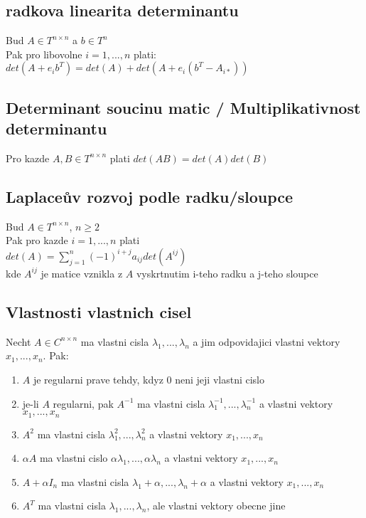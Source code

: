 \documentclass[a4paper]{article}
\begin{document}
\subsection*{radkova linearita determinantu}
Bud $A \in T^{n \times n}$ a $b \in T^n$\\
Pak pro libovolne $i = 1, ..., n$ plati:\\
$det(A + e_ib^T) = det(A) + det(A + e_i(b^T - A_{i*}))$


\subsection*{Determinant soucinu matic / Multiplikativnost determinantu}
Pro kazde $A, B \in T^{n\times n}$ plati $det(AB) = det(A) det(B)$


\subsection*{Laplaceův rozvoj podle radku/sloupce}
Bud $A \in T^{n\times n}$, $n \geq 2$\\
Pak pro kazde $i = 1, ... , n$ plati\\
$det(A) = \sum^n_{j=1}(-1)^{i+j} a_{ij} det(A^{ij})$\\
kde $A^{ij}$ je matice vznikla z $A$ vyskrtnutim i-teho radku a j-teho sloupce


\subsection*{Vlastnosti vlastnich cisel}
Necht $A \in C^{n\times n}$ ma vlastni cisla $\lambda_1, ... , \lambda_n$
a jim odpovidajici vlastni vektory $x_1, ... , x_n$. Pak:
\begin{enumerate}
	\item $A$ je regularni prave tehdy, kdyz 0 neni jeji vlastni cislo
	\item je-li $A$ regularni, pak $A^{-1}$ ma vlastni cisla $\lambda_1^{-1},...,\lambda_n^{-1}$ a vlastni vektory $x_1,...,x_n$
	\item $A^2$ ma vlastni cisla $\lambda_1^2,...,\lambda_n^2$ a vlastni vektory $x_1,...,x_n$
	\item $\alpha A$ ma vlastni cislo $\alpha\lambda_1,...,\alpha\lambda_n$ a vlastni vektory $x_1,...,x_n$
	\item $A+\alpha I_n$ ma vlastni cisla $\lambda_1+\alpha,...,\lambda_n+\alpha$ a vlastni vektory $x_1,...,x_n$
	\item $A^T$ ma vlastni cisla $\lambda_1,...,\lambda_n$, ale vlastni vektory obecne jine
\end{enumerate}
\end{document}
